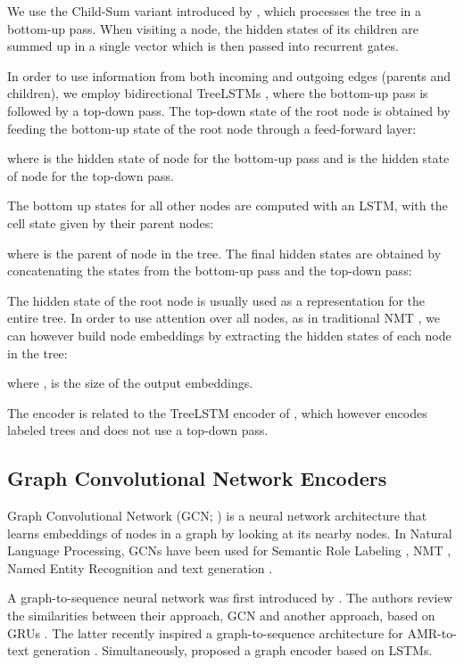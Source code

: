 \documentclass[11pt,a4paper]{article}
\begin{document}
We use the Child-Sum variant introduced by , which processes the tree in a bottom-up pass. When visiting a node, the hidden states of its children are summed up in a single vector which is then passed into recurrent gates.

In order to use information from both incoming and outgoing edges (parents and children), we employ bidirectional TreeLSTMs \cite{eriguchi2016tree}, where the bottom-up pass is followed by a top-down pass. The top-down state of the root node is obtained by feeding the bottom-up state of the root node through a feed-forward layer:

where  is the hidden state of node  for the bottom-up pass and  is the hidden state of node  for the top-down pass.

The bottom up states for all other nodes are computed with an LSTM, with the cell state given by their parent nodes:

where  is the parent of node  in the tree.
The final hidden states are obtained by concatenating the states from the bottom-up pass and the top-down pass:
 

The hidden state of the root node is usually used as a representation for the entire tree. In order to use attention over all nodes, as in traditional NMT \cite{bahdanau2014neural}, we can however build node embeddings by extracting the hidden states of each node in the tree:

where ,  is the size of the output embeddings.

The encoder is related to the TreeLSTM encoder of , which however encodes labeled trees and does not use a top-down pass.

\subsection{Graph Convolutional Network Encoders}
\label{sec:graph_encoders}

Graph Convolutional Network (GCN; \citealt{duvenaud2015convolutional,kipf2016semi}) is a neural network architecture that learns embeddings of nodes in a graph by looking at its nearby nodes. 
In Natural Language Processing, GCNs have been used for Semantic Role Labeling \cite{marcheggiani2017encoding}, NMT \cite{bastings2017graph}, Named Entity Recognition \cite{cetoli2017graph} and text generation \cite{diego}.



A graph-to-sequence neural network was first introduced by . The authors review the similarities between their approach, GCN and another approach, based on GRUs \cite{li2015gated}. The latter recently inspired a graph-to-sequence architecture for AMR-to-text generation \cite{beck}. Simultaneously,  proposed a graph encoder based on LSTMs. 
\end{document}
